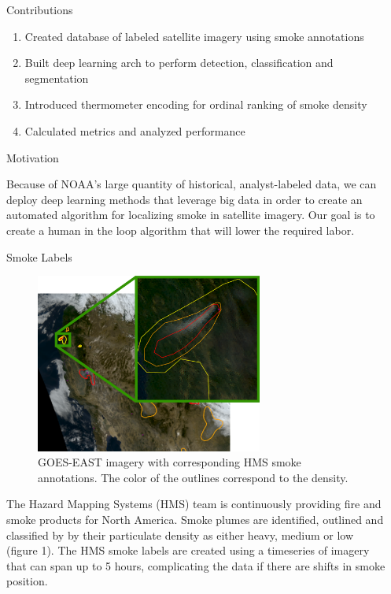 \documentclass[final,16pt]{beamer}
\newlength{\sepwidth}
\newlength{\colwidth}
\newcommand{\separatorcolumn}{\begin{column}{\sepwidth}\end{column}}
\begin{document}
\begin{frame}[t]
\begin{columns}[t]
\separatorcolumn

\begin{column}{\colwidth}

  \begin{exampleblock}{Contributions}
    \begin{enumerate}
      \item{Created database of labeled satellite imagery using smoke annotations}
      \item{Built deep learning arch to perform detection, classification and segmentation}
      \item{Introduced thermometer encoding for ordinal ranking of smoke density}
      \item{Calculated metrics and analyzed performance}
    \end{enumerate}

  \end{exampleblock}

  \begin{block}{Motivation}

   Because of NOAA's large quantity of historical, analyst-labeled data, we can deploy deep learning methods that leverage big data in order to create an automated algorithm for localizing smoke in satellite imagery. Our goal is to create a human in the loop algorithm that will lower the required labor.

  \end{block}

  \begin{block}{Smoke Labels}

    \begin{figure}
      \centering
      \includegraphics[width=0.7\textwidth]{figures/zoomed.png}
      \caption{GOES-EAST imagery with corresponding HMS smoke annotations. The color of the outlines correspond to the density.}
    \end{figure}
    The Hazard Mapping Systems (HMS) team is continuously providing fire and smoke products for North America. Smoke plumes are identified, outlined and classified by by their particulate density as either heavy, medium or low (figure 1). The HMS smoke labels are created using a timeseries of imagery that can span up to 5 hours, complicating the data if there are shifts in smoke position.
  \end{block}



\end{column}
\end{columns}
\end{frame}
\end{document}
